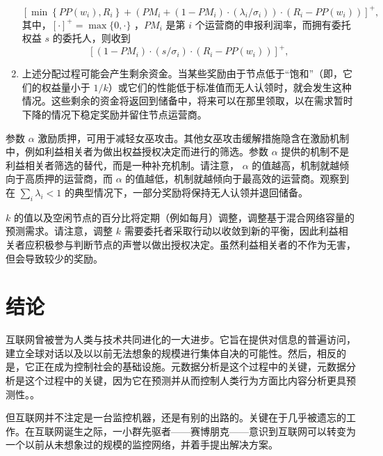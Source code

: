 \documentclass{article}
\begin{document}
\begin{enumerate}[1. ]
\begin{equation}\nonumber
   \left[\min \left\{P P\left(w_{i}\right), R_{i}\right\}+\left(P M_{i}+\left(1-P M_{i}\right) \cdot\left(\lambda_{i} / \sigma_{i}\right)\right) \cdot\left(R_{i}-P P\left(w_{i}\right)\right)\right]^{+},
\end{equation}
   其中，$[\cdot]^{+}=\max \{0, \cdot\}$ ，$PM_{i}$ 是第 $i$ 个运营商的申报利润率，而拥有委托权益 $s$ 的委托人，则收到
\begin{equation}\nonumber
   \left[\left(1-P M_{i}\right) \cdot\left(s / \sigma_{i}\right) \cdot\left(R_{i}-P P\left(w_{i}\right)\right)\right]^{+},
\end{equation}
\item 上述分配过程可能会产生剩余资金。当某些奖励由于节点低于“饱和”（即，它们的权益量小于 $1/k$）或它们的性能低于标准值而无人认领时，就会发生这种情况。这些剩余的资金将返回到储备中，将来可以在那里领取，以在需求暂时下降的情况下稳定奖励并留住节点运营商。
\end{enumerate}

	参数 $\alpha$ 激励质押，可用于减轻女巫攻击。其他女巫攻击缓解措施隐含在激励机制中，例如利益相关者为做出权益授权决定而进行的筛选。参数 $\alpha$ 提供的机制不是利益相关者筛选的替代，而是一种补充机制。请注意， $\alpha$ 的值越高，机制就越倾向于高质押的运营商，而 $\alpha$ 的值越低，机制就越倾向于最高效的运营商。观察到在 $\sum_{i} \lambda_{i}<1$ 的典型情况下，一部分奖励将保持无人认领并退回储备。\newline

	$k$ 的值以及空闲节点的百分比将定期（例如每月）调整，调整基于混合网络容量的预测需求。请注意，调整 $k$ 需要委托者采取行动以收敛到新的平衡，因此利益相关者应积极参与判断节点的声誉以做出授权决定。虽然利益相关者的不作为无害，但会导致较少的奖励。\newline

	\section{结论}

	互联网曾被誉为人类与技术共同进化的一大进步\cite{ref73}。它旨在提供对信息的普遍访问，建立全球对话以及以以前无法想象的规模进行集体自决的可能性。然后，相反的是，它正在成为控制社会的基础设施。元数据分析是这个过程中的关键，元数据分析是这个过程中的关键，因为它在预测并从而控制人类行为方面比内容分析更具预测性。\cite{ref85}。\newline

	但互联网并不注定是一台监控机器，还是有别的出路的。关键在于几乎被遗忘的工作。在互联网诞生之际，一小群先驱者——赛博朋克——意识到互联网可以转变为一个以前从未想象过的规模的监控网络，并着手提出解决方案。\newline
\end{document}
